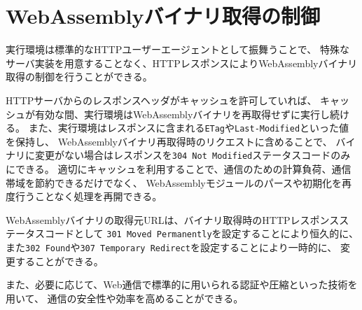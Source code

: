 \section{WebAssemblyバイナリ取得の制御}

実行環境は標準的なHTTPユーザーエージェントとして振舞うことで、
特殊なサーバ実装を用意することなく、HTTPレスポンスによりWebAssemblyバイナリ取得の制御を行うことができる。

HTTPサーバからのレスポンスヘッダがキャッシュを許可していれば、
キャッシュが有効な間、実行環境はWebAssemblyバイナリを再取得せずに実行し続ける。
また、実行環境はレスポンスに含まれる\verb|ETag|や\verb|Last-Modified|といった値を保持し、
WebAssemblyバイナリ再取得時のリクエストに含めることで、
バイナリに変更がない場合はレスポンスを\verb|304 Not Modified|ステータスコードのみにできる。
適切にキャッシュを利用することで、通信のための計算負荷、通信帯域を節約できるだけでなく、
WebAssemblyモジュールのパースや初期化を再度行うことなく処理を再開できる。

WebAssemblyバイナリの取得元URLは、バイナリ取得時のHTTPレスポンスステータスコードとして
{\tt 301 Moved Permanently}を設定することにより恒久的に、
また{\tt 302 Found}や{\tt 307 Temporary Redirect}を設定することにより一時的に、
変更することができる。

また、必要に応じて、Web通信で標準的に用いられる認証や圧縮といった技術を用いて、
通信の安全性や効率を高めることができる。
